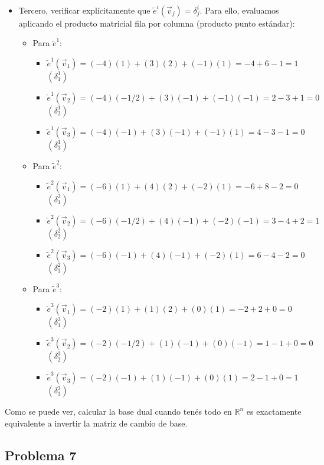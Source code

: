 \documentclass[11pt,spanish]{article}
\begin{document}
\begin{itemize}
\item Tercero, verificar explícitamente que $\tilde{e}^i(\vec{v}_j) = \delta^i_j$. 
Para ello, evaluamos aplicando el producto matricial fila por columna (producto punto estándar):

\begin{itemize}
\item Para $\tilde{e}^1$:
\begin{itemize}
\item $\tilde{e}^1(\vec{v}_1) = (-4)(1) + (3)(2) + (-1)(1) = -4 + 6 - 1 = 1$  $(\delta^1_1)$
\item $\tilde{e}^1(\vec{v}_2) = (-4)(-1/2) + (3)(-1) + (-1)(-1) = 2 - 3 + 1 = 0$  $(\delta^1_2)$
\item $\tilde{e}^1(\vec{v}_3) = (-4)(-1) + (3)(-1) + (-1)(1) = 4 - 3 - 1 = 0$  $(\delta^1_3)$
\end{itemize}

\item Para $\tilde{e}^2$:
\begin{itemize}
\item $\tilde{e}^2(\vec{v}_1) = (-6)(1) + (4)(2) + (-2)(1) = -6 + 8 - 2 = 0$  $(\delta^2_1)$
\item $\tilde{e}^2(\vec{v}_2) = (-6)(-1/2) + (4)(-1) + (-2)(-1) = 3 - 4 + 2 = 1$  $(\delta^2_2)$
\item $\tilde{e}^2(\vec{v}_3) = (-6)(-1) + (4)(-1) + (-2)(1) = 6 - 4 - 2 = 0$  $(\delta^2_3)$
\end{itemize}

\item Para $\tilde{e}^3$:
\begin{itemize}
\item $\tilde{e}^3(\vec{v}_1) = (-2)(1) + (1)(2) + (0)(1) = -2 + 2 + 0 = 0$  $(\delta^3_1)$
\item $\tilde{e}^3(\vec{v}_2) = (-2)(-1/2) + (1)(-1) + (0)(-1) = 1 - 1 + 0 = 0$  $(\delta^3_2)$
\item $\tilde{e}^3(\vec{v}_3) = (-2)(-1) + (1)(-1) + (0)(1) = 2 - 1 + 0 = 1$  $(\delta^3_3)$
\end{itemize}

\end{itemize}
\end{itemize}

Como se puede ver, calcular la base dual cuando tenés todo en $\mathbb{R}^n$ es exactamente equivalente a invertir la matriz de cambio de base.

\subsection*{Problema 7}
\end{document}
